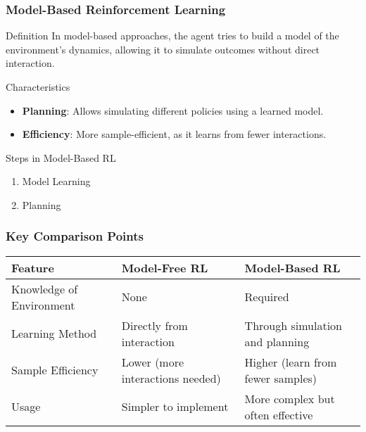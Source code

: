 \documentclass[aspectratio=169]{beamer}
\begin{document}
\begin{frame}[fragile]
    \frametitle{Model-Based Reinforcement Learning}
    \begin{block}{Definition}
        In model-based approaches, the agent tries to build a model of the environment's dynamics, allowing it to simulate outcomes without direct interaction.
    \end{block}
    
    \begin{block}{Characteristics}
        \begin{itemize}
            \item \textbf{Planning}: Allows simulating different policies using a learned model.
            \item \textbf{Efficiency}: More sample-efficient, as it learns from fewer interactions.
        \end{itemize}
    \end{block}

    \begin{block}{Steps in Model-Based RL}
        \begin{enumerate}
            \item Model Learning
            \item Planning
        \end{enumerate}
    \end{block}
\end{frame}

\begin{frame}[fragile]
    \frametitle{Key Comparison Points}
    \begin{table}[ht]
        \centering
        \begin{tabular}{|l|l|l|}
            \hline
            \textbf{Feature}                 & \textbf{Model-Free RL}                  & \textbf{Model-Based RL}               \\ \hline
            Knowledge of Environment          & None                                   & Required                               \\ \hline
            Learning Method                   & Directly from interaction              & Through simulation and planning        \\ \hline
            Sample Efficiency                 & Lower (more interactions needed)      & Higher (learn from fewer samples)     \\ \hline
            Usage                             & Simpler to implement                  & More complex but often effective      \\ \hline
        \end{tabular}
    \end{table}
\end{frame}
\end{document}
